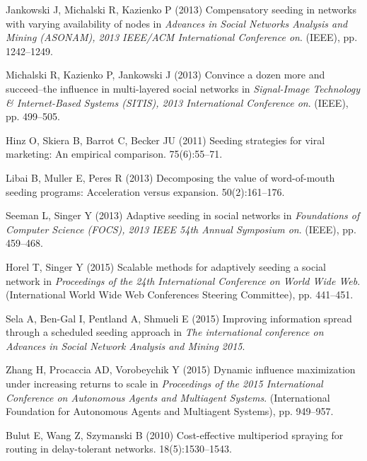 \documentclass[11pt]{article} %
\begin{document}
\begin{thebibliography}{10}
Jankowski J, Michalski R, Kazienko P (2013) Compensatory seeding in networks
  with varying availability of nodes in {\em Advances in Social Networks
  Analysis and Mining (ASONAM), 2013 IEEE/ACM International Conference on}.
\newblock (IEEE), pp. 1242--1249.

Michalski R, Kazienko P, Jankowski J (2013) Convince a dozen more and
  succeed--the influence in multi-layered social networks in {\em Signal-Image
  Technology \& Internet-Based Systems (SITIS), 2013 International Conference
  on}.
\newblock (IEEE), pp. 499--505.

Hinz O, Skiera B, Barrot C, Becker JU (2011) Seeding strategies for viral
  marketing: An empirical comparison.
 75(6):55--71.

Libai B, Muller E, Peres R (2013) Decomposing the value of word-of-mouth
  seeding programs: Acceleration versus expansion.
 50(2):161--176.

Seeman L, Singer Y (2013) Adaptive seeding in social networks in {\em
  Foundations of Computer Science (FOCS), 2013 IEEE 54th Annual Symposium on}.
\newblock (IEEE), pp. 459--468.

Horel T, Singer Y (2015) Scalable methods for adaptively seeding a social
  network in {\em Proceedings of the 24th International Conference on World
  Wide Web}.
\newblock (International World Wide Web Conferences Steering Committee), pp.
  441--451.

Sela A, Ben-Gal I, Pentland A, Shmueli E (2015) Improving information spread
  through a scheduled seeding approach in {\em The international conference on
  Advances in Social Network Analysis and Mining 2015}.

Zhang H, Procaccia AD, Vorobeychik Y (2015) Dynamic influence maximization
  under increasing returns to scale in {\em Proceedings of the 2015
  International Conference on Autonomous Agents and Multiagent Systems}.
\newblock (International Foundation for Autonomous Agents and Multiagent
  Systems), pp. 949--957.

Bulut E, Wang Z, Szymanski B (2010) Cost-effective multiperiod spraying for
  routing in delay-tolerant networks.
 18(5):1530--1543.


\end{thebibliography}
\end{document}
